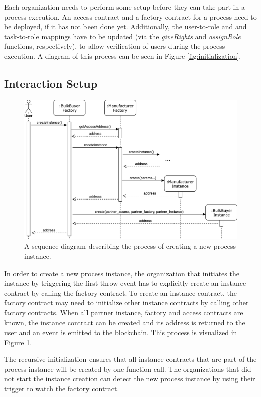\documentclass[runningheads]{llncs}
\begin{document}
Each organization needs to perform some setup before they can take part in a process execution.
An access contract and a factory contract for a process need to be deployed, if it has not been done yet.
Additionally, the user-to-role and and task-to-role mappings have to be updated (via the \emph{giveRights} and \emph{assignRole} functions, respectively), to allow verification of users during the process execution.
A diagram of this process can be seen in Figure \ref{fig:initialization}.

\subsection{Interaction Setup}
\begin{figure}
	\centering
	\includegraphics[width=\textwidth]{fig/instance_creation.eps}
	\caption{A sequence diagram describing the process of creating a new process instance.}
	\label{fig:instance_creation}
\end{figure}

In order to create a new process instance, the organization that initiates the instance by triggering the first throw event has to explicitly create an instance contract by calling the factory contract.
To create an instance contract, the factory contract may need to initialize other instance contracts by calling other factory contracts.
When all partner instance, factory and access contracts are known, the instance contract can be created and its address is returned to the user and an event is emitted to the blockchain.
This process is visualized in Figure \ref{fig:instance_creation}.

The recursive initialization ensures that all instance contracts that are part of the process instance will be created by one function call.
The organizations that did not start the instance creation can detect the new process instance by using their trigger to watch the factory contract.
\end{document}
